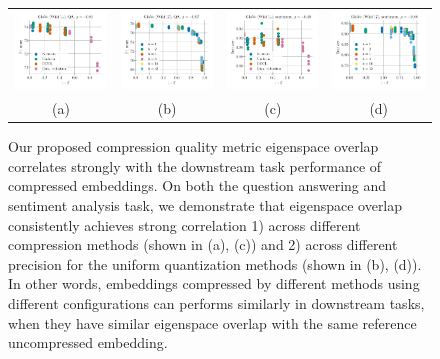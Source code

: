 
\begin{figure}
	\begin{tabular}{c c c c}
		\includegraphics[width=0.23\linewidth]{figures/glove400k_qa_best-f1_vs_subspace-eig-overlap_linx.pdf} &
		\includegraphics[width=0.23\linewidth]{figures/glove-wiki400k-am_qa_best-f1_vs_subspace-eig-overlap_linx.pdf} &
		\includegraphics[width=0.23\linewidth]{figures/glove400k_sentiment_trec_test-acc_vs_subspace-eig-overlap_linx.pdf} &
		\includegraphics[width=0.23\linewidth]{figures/glove-wiki400k-am_sentiment_trec_test-acc_vs_subspace-eig-overlap_linx.pdf}	\\
		(a) & (b) & (c) & (d) 
	\end{tabular}
	\label{fig:bad_correlation}
	\caption{Our proposed compression quality metric eigenspace overlap correlates strongly with the downstream task performance of compressed embeddings.  On both the question answering and sentiment analysis task, we demonstrate that eigenspace overlap consistently achieves strong correlation 1) across different compression methods (shown in (a), (c)) and 2) across different precision for the uniform quantization methods (shown in (b), (d)). In other words, embeddings compressed by different methods using different configurations can performs similarly in downstream tasks, when they have similar eigenspace overlap with the same reference uncompressed embedding.}
\end{figure}
